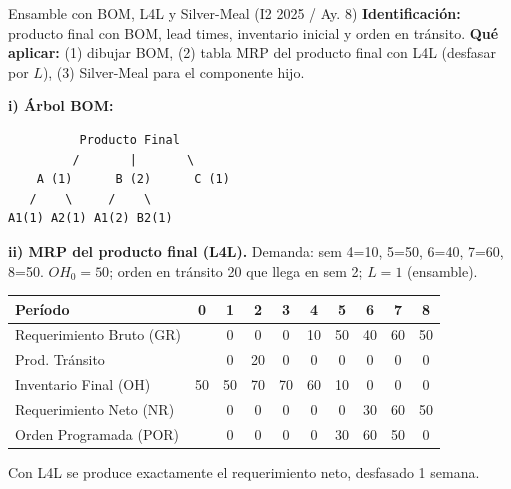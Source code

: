 \begin{tipprueba}{Ensamble con BOM, L4L y Silver-Meal (I2 2025 / Ay. 8)}
   \textbf{Identificación:} producto final con BOM, lead times, inventario inicial y orden en tránsito. 
   \textbf{Qué aplicar:} (1) dibujar BOM, (2) tabla MRP del producto final con L4L (desfasar por $L$), (3) Silver-Meal para el componente hijo.

   \textbf{i) Árbol BOM:}
   \begin{verbatim}
          Producto Final
         /       |       \
    A (1)      B (2)      C (1)
   /    \     /    \
A1(1) A2(1) A1(2) B2(1)
   \end{verbatim}

   \textbf{ii) MRP del producto final (L4L).} Demanda: sem 4=10, 5=50, 6=40, 7=60, 8=50. $OH_0 = 50$; orden en tránsito 20 que llega en sem 2; $L = 1$ (ensamble).

   \begin{center}
   \small
   \begin{tabular}{lccccccccc}
     \toprule
     \textbf{Período} & \textbf{0} & \textbf{1} & \textbf{2} & \textbf{3} & \textbf{4} & \textbf{5} & \textbf{6} & \textbf{7} & \textbf{8} \\
     \midrule
     Requerimiento Bruto (GR) & & 0 & 0 & 0 & 10 & 50 & 40 & 60 & 50 \\
     Prod. Tránsito & & 0 & 20 & 0 & 0 & 0 & 0 & 0 & 0 \\
     Inventario Final (OH) & 50 & 50 & 70 & 70 & 60 & 10 & 0 & 0 & 0 \\
     Requerimiento Neto (NR) & & 0 & 0 & 0 & 0 & 0 & 30 & 60 & 50 \\
     Orden Programada (POR) & & 0 & 0 & 0 & 0 & 30 & 60 & 50 & 0 \\
     \bottomrule
   \end{tabular}
   \end{center}

   Con L4L se produce exactamente el requerimiento neto, desfasado 1 semana.
\end{tipprueba}

